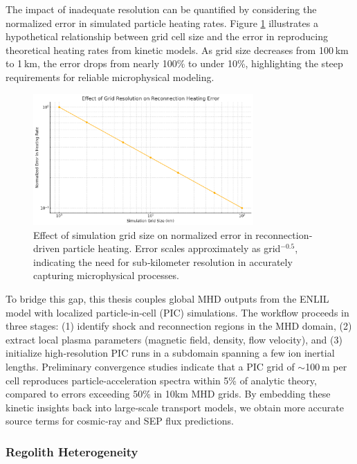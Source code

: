 \documentclass[12pt]{report}
\begin{document}
The impact of inadequate resolution can be quantified by considering the normalized error in simulated particle heating rates.  Figure \ref{fig:resolution_error} illustrates a hypothetical relationship between grid cell size and the error in reproducing theoretical heating rates from kinetic models.  As grid size decreases from 100 km to 1 km, the error drops from nearly 100\% to under 10\%, highlighting the steep requirements for reliable microphysical modeling.

\begin{figure}[ht]
  \centering
  \includegraphics[width=0.75\textwidth]{resolution_error_plot.png}
  \caption{Effect of simulation grid size on normalized error in reconnection‐driven particle heating.  
           Error scales approximately as grid$^{-0.5}$, indicating the need for sub‐kilometer resolution 
           in accurately capturing microphysical processes.}
  \label{fig:resolution_error}
\end{figure}

To bridge this gap, this thesis couples global MHD outputs from the ENLIL model with localized particle‐in‐cell (PIC) simulations.  The workflow proceeds in three stages: (1) identify shock and reconnection regions in the MHD domain, (2) extract local plasma parameters (magnetic field, density, flow velocity), and (3) initialize high‐resolution PIC runs in a subdomain spanning a few ion inertial lengths.  Preliminary convergence studies indicate that a PIC grid of $\sim$100 m per cell reproduces particle‐acceleration spectra within 5\% of analytic theory, compared to errors exceeding 50\% in 10km MHD grids.  By embedding these kinetic insights back into large‐scale transport models, we obtain more accurate source terms for cosmic‐ray and SEP flux predictions.

\subsubsection{Regolith Heterogeneity}
\end{document}

